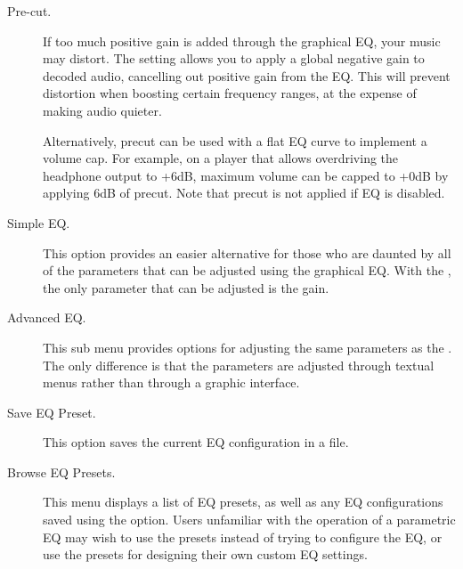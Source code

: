 {\begin {description}
  \item[Pre-cut.]
  If too much positive gain is added through the graphical EQ, your music may 
  distort.  The  setting allows you to apply a global negative
  gain to decoded audio, cancelling out positive gain from the EQ.  This will
  prevent distortion when boosting certain frequency ranges, at the expense of 
  making audio quieter.
  
  Alternatively, precut can be used with a flat EQ curve to implement a volume
  cap.  For example, on a player that allows overdriving the headphone output
  to +6dB, maximum volume can be capped to +0dB by applying 6dB of precut. Note
  that precut is not applied if EQ is disabled.  

\item[Simple EQ.]
This option provides an easier alternative for those who are daunted by all of
the parameters that can be adjusted using the graphical EQ. With the
, the only parameter that can be adjusted is the gain.

\item[Advanced EQ.]
This sub menu provides options for adjusting the same parameters as the
. The only difference is that the parameters are
adjusted through textual menus rather than through a graphic interface.

\item[Save EQ Preset.]
This option saves the current EQ configuration in a  file.

\item[Browse EQ Presets.]
This menu displays a list of EQ presets, as well as any EQ configurations saved
using the  option. Users unfamiliar with the
operation of a parametric EQ may wish to use the presets instead of trying to
configure the EQ, or use the presets for designing their own custom EQ
settings.

\end{description}
}

